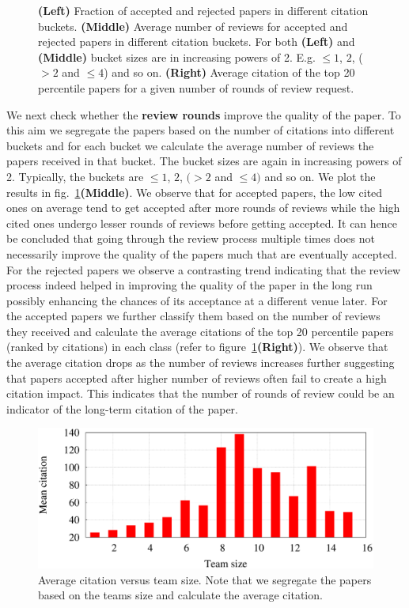 \begin{figure}[htpb]
\begin{tabular}{ccc}
 \end{tabular}
  \caption{{\bf (Left)} Fraction of accepted and rejected papers in different citation buckets. {\bf (Middle)} Average number of reviews for accepted and rejected papers in different citation buckets. For both {\bf (Left)} and {\bf(Middle) } bucket sizes are in increasing powers of 2. E.g. $\leq 1$, $2$, ($>2$ and $\leq 4$) and so on. {\bf (Right)} Average citation of the top 20 percentile  papers for a given number of rounds of review request.}
   \label{fig4}
 \end{figure}


We next check whether the {\bf review rounds} improve the quality of the paper. To this aim we segregate the papers based on the number of citations into different buckets and for each bucket we calculate the average number of reviews the papers received in that bucket. The bucket sizes are again in increasing powers of 2. Typically, the buckets are $\leq 1$, $2$, $(>2$ and $\leq 4)$ and so on. We plot the results in fig.~\ref{fig4}{\bf (Middle)}. We observe that for accepted papers, the low cited ones on average tend to get accepted after more rounds of reviews while the high cited ones undergo lesser rounds of reviews before getting accepted. It can hence be concluded that going through the review process multiple times does not necessarily improve the quality of the papers much that are eventually accepted. For the rejected papers we observe a contrasting trend indicating that the review process indeed helped in improving the quality of the paper in the long run possibly enhancing the chances of its acceptance at a different venue later. For the accepted papers we further classify them based on the number of reviews they received and calculate the average citations of the top 20 percentile papers (ranked by citations) in each class (refer to figure~\ref{fig4}{\bf (Right)}). We observe that the average citation drops as the number of reviews increases further suggesting that papers accepted after higher number of reviews often fail to create a high citation impact. This indicates that the number of rounds of review could be an indicator of the long-term citation of the paper. 

\begin{figure}
\centering
\includegraphics[scale  = 0.25]{./texfiles/Chapter_4/jcdl/figures/team_citation}
\caption{\label{team:citation} Average citation versus team size. Note that we segregate the papers based on the teams size and calculate the average citation.}
\end{figure}


